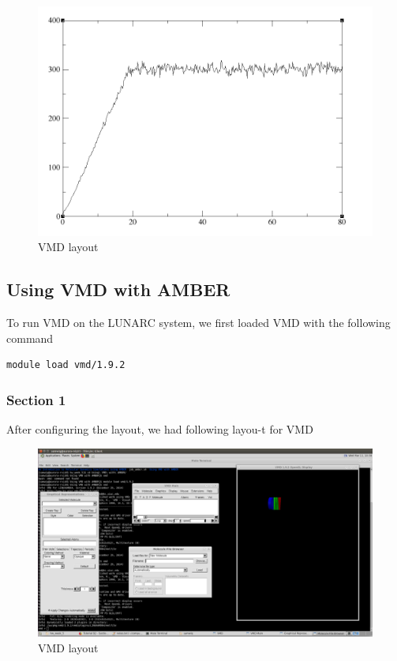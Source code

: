 \documentclass[11pt]{article}
\makeatletter
\def\maxwidth{\ifdim\Gin@nat@width>\linewidth\linewidth
    \else\Gin@nat@width\fi}
\let\Oldincludegraphics\includegraphics
\renewcommand{\includegraphics}[1]{\Oldincludegraphics[width=.8\maxwidth]{#1}}
\makeatother
\begin{document}
\begin{figure}
\centering
\includegraphics{Screenshot_temp_intro.png}
\caption{VMD layout}
\end{figure}

    \subsection{Using VMD with AMBER}\label{using-vmd-with-amber}

To run VMD on the LUNARC system, we first loaded VMD with the following
command

\begin{verbatim}
module load vmd/1.9.2
\end{verbatim}

\subsubsection{Section 1}\label{section-1}

After configuring the layout, we had following layou-t for VMD

\begin{figure}
\centering
\includegraphics{Screenshot_vmd_setup.png}
\caption{VMD layout}
\end{figure}
\end{document}
